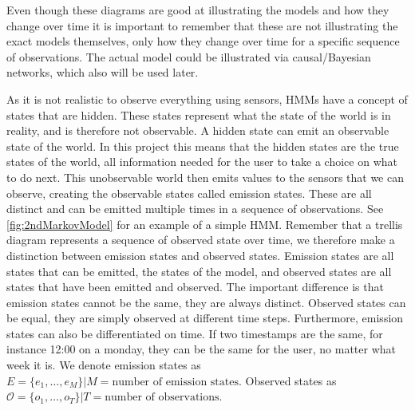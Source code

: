 Even though these diagrams are good at illustrating the models and how they change over time it is important to remember that these are not illustrating the exact models themselves, only how they change over time for a specific sequence of observations. The actual model could be illustrated via causal/Bayesian networks, which also will be used later.

As it is not realistic to observe everything using sensors, HMMs have a concept of states that are hidden. These states represent what the state of the world is in reality, and is therefore not observable. A hidden state can emit an observable state of the world. In this project this means that the hidden states are the true states of the world, all information needed for the user to take a choice on what to do next. This unobservable world then emits values to the sensors that we can observe, creating the observable states called emission states. These are all distinct and can be emitted multiple times in a sequence of observations. See \cref{fig:2ndMarkovModel} for an example of a simple HMM. Remember that a trellis diagram represents a sequence of observed state over time, we therefore make a distinction between emission states and observed states. Emission states are all states that can be emitted, the states of the model, and observed states are all states that have been emitted and observed. The important difference is that emission states cannot be the same, they are always distinct. Observed states can be equal, they are simply observed at different time steps. Furthermore, emission states can also be differentiated on time. If two timestamps are the same, for instance 12:00 on a monday, they can be the same for the user, no matter what week it is. We denote emission states as $E=\{e_1, \dots ,e_{M}\}|M = \text{number of emission states}$. Observed states as $\mathcal{O}=\{o_1, \dots , o_T\}|T = \text{number of observations}$.


